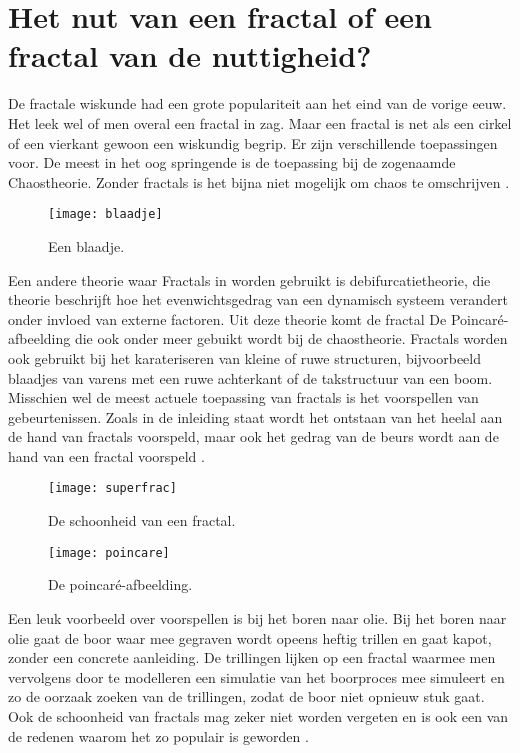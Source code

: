 \documentclass[11pt,fleqn]{book} %
\begin{document}
\section{Het nut van een fractal of een fractal van de nuttigheid?}
De fractale wiskunde had een grote populariteit aan het eind van de vorige eeuw. Het leek wel of men overal een fractal in zag. Maar een fractal is net als een cirkel of een vierkant gewoon een wiskundig begrip. Er zijn verschillende toepassingen voor. De meest in het oog springende is de toepassing bij de zogenaamde Chaostheorie. Zonder fractals is het bijna niet mogelijk om chaos te omschrijven \cite{deterchaos}\cite{fracnuttig}.
\begin{figure}[h]
	\centering\texttt{[image: blaadje]}
	\caption{Een blaadje.}
	\label{fig:blaadje}
\end{figure}
Een andere theorie waar Fractals in worden gebruikt is debifurcatietheorie, die theorie beschrijft hoe het evenwichtsgedrag van een dynamisch systeem verandert onder invloed van externe factoren. Uit deze theorie komt de fractal De Poincaré-afbeelding die ook onder meer gebuikt wordt bij de chaostheorie. 
Fractals worden ook gebruikt bij het karateriseren van kleine of ruwe structuren, bijvoorbeeld blaadjes van varens met een ruwe achterkant of de takstructuur van een boom. Misschien wel de meest actuele toepassing van fractals is het voorspellen van gebeurtenissen. Zoals in de inleiding staat wordt het ontstaan van het heelal aan de hand van fractals voorspeld, maar ook het gedrag van de beurs wordt aan de hand van een fractal voorspeld \cite{opdebeurs}.
\begin{figure}[h]
	\centering\texttt{[image: superfrac]}
	\caption{De schoonheid van een fractal.}
	\label{fig:superfrac}
\end{figure} 
\begin{figure}[h]
	\centering\texttt{[image: poincare]}
	\caption{De poincaré-afbeelding.}
	\label{fig:superfrac}
\end{figure} 
Een leuk voorbeeld over voorspellen is bij het boren naar olie. Bij het boren naar olie gaat de boor waar mee gegraven wordt opeens heftig trillen en gaat kapot, zonder een concrete aanleiding. De trillingen lijken op een fractal waarmee men vervolgens door te modelleren een simulatie van het boorproces mee simuleert en zo de oorzaak zoeken van de trillingen, zodat de boor niet opnieuw stuk gaat.
Ook de schoonheid van fractals mag zeker niet worden vergeten en is ook een van de redenen waarom het zo populair is geworden \cite{fractoepassingen}.
\end{document}
